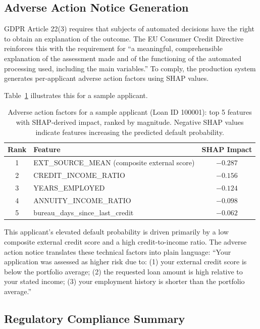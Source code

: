 \documentclass[11pt, a4paper]{article}
\begin{document}
\subsection{Adverse Action Notice Generation}

GDPR Article 22(3) requires that subjects of automated decisions have the right to obtain an explanation of the outcome. The EU Consumer Credit Directive reinforces this with the requirement for ``a meaningful, comprehensible explanation of the assessment made and of the functioning of the automated processing used, including the main variables.'' To comply, the production system generates per-applicant adverse action factors using SHAP values.

Table~\ref{tab:adverse_action} illustrates this for a sample applicant.

\begin{table}[H]
  \centering
  \caption{Adverse action factors for a sample applicant (Loan ID 100001): top 5 features with SHAP-derived impact, ranked by magnitude. Negative SHAP values indicate features increasing the predicted default probability.}
  \label{tab:adverse_action}
  \begin{tabular}{clc}
    \toprule
    Rank & Feature & SHAP Impact \\
    \midrule
    1 & EXT\_SOURCE\_MEAN (composite external score) & $-0.287$ \\
    2 & CREDIT\_INCOME\_RATIO & $-0.156$ \\
    3 & YEARS\_EMPLOYED & $-0.124$ \\
    4 & ANNUITY\_INCOME\_RATIO & $-0.098$ \\
    5 & bureau\_days\_since\_last\_credit & $-0.062$ \\
    \bottomrule
  \end{tabular}
\end{table}

This applicant's elevated default probability is driven primarily by a low composite external credit score and a high credit-to-income ratio. The adverse action notice translates these technical factors into plain language: ``Your application was assessed as higher risk due to: (1) your external credit score is below the portfolio average; (2) the requested loan amount is high relative to your stated income; (3) your employment history is shorter than the portfolio average.''

\subsection{Regulatory Compliance Summary}
\end{document}
